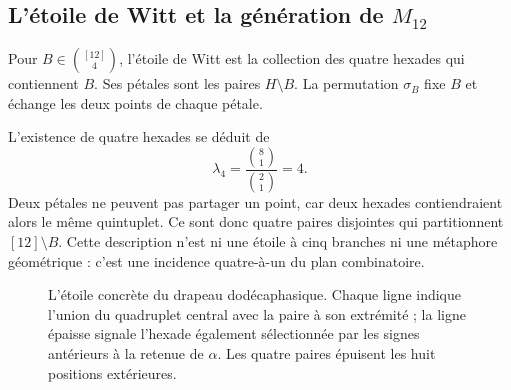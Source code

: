 

\subsection{L'étoile de Witt et la génération de \texorpdfstring{$M_{12}$}{M12}}
\label{exc:estrella}

\begin{definition}
\label{exc:def-estrella}
Pour $B\in\binom{[12]}4$, l'étoile de Witt est la collection des
quatre hexades qui contiennent $B$. Ses pétales sont les paires $H\setminus B$.
La permutation $\sigma_B$ fixe $B$ et échange les deux points de chaque
pétale.
\end{definition}

L'existence de quatre hexades se déduit de
\[
 \lambda_4=\frac{\binom81}{\binom21}=4.
\]
Deux pétales ne peuvent pas partager un point, car deux hexades contiendraient alors le même quintuplet. Ce sont donc quatre paires disjointes qui partitionnent $[12]\setminus B$. Cette description n'est ni une étoile à cinq branches ni une métaphore géométrique : c'est une incidence quatre-à-un du plan combinatoire.

\begin{figure}[htbp]
\centering
{}
\caption{L'étoile concrète du drapeau dodécaphasique. Chaque ligne
indique l'union du quadruplet central avec la paire à son extrémité ; la
ligne épaisse signale l'hexade également sélectionnée par les signes
antérieurs à la retenue de $\alpha$. Les quatre paires épuisent les huit
positions extérieures.}
\label{exc:fig-estrella}
\end{figure}

